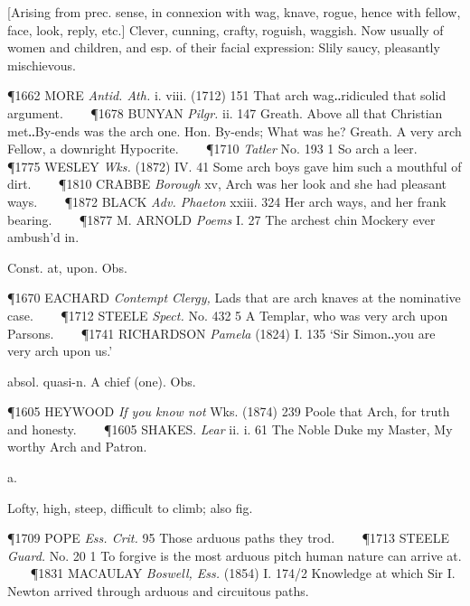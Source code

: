 \begin{description}[wide, labelwidth=!, labelindent=0pt]
\begin{myenumerate}
 [Arising from prec. sense, in connexion with wag, knave, rogue, hence with fellow, face, look, reply, etc.] Clever, cunning, crafty, roguish, waggish. Now usually of women and children, and esp. of their facial expression: Slily saucy, pleasantly mischievous.

\P 1662 MORE  \textit{Antid. Ath.} i. viii. (1712) 151 That arch wag‥ridiculed that solid argument.    
\P 1678 BUNYAN  \textit{Pilgr.} ii. 147 Greath. Above all that Christian met‥By-ends was the arch one. Hon. By-ends; What was he? Greath. A very arch Fellow, a downright Hypocrite.    
\P 1710 \textit{Tatler}  No. 193 1 So arch a leer.    
\P 1775 WESLEY  \textit{Wks.} (1872) IV. 41 Some arch boys gave him such a mouthful of dirt.    
\P 1810 CRABBE  \textit{Borough} xv, Arch was her look and she had pleasant ways.    
\P 1872 BLACK  \textit{Adv. Phaeton} xxiii. 324 Her arch ways, and her frank bearing.    
\P 1877 M. ARNOLD  \textit{Poems} I. 27 The archest chin Mockery ever ambush'd in.

 Const. at, upon. Obs.

\P 1670 EACHARD  \textit{Contempt Clergy,} Lads that are arch knaves at the nominative case.    
\P 1712 STEELE  \textit{Spect.} No. 432 5 A Templar, who was very arch upon Parsons.    
\P 1741 RICHARDSON  \textit{Pamela} (1824) I. 135 ‘Sir Simon‥you are very arch upon us.’

 absol. quasi-n. A chief (one). Obs.

\P 1605 HEYWOOD  \textit{If you know not} Wks. (1874) 239 Poole that Arch, for truth and honesty.    
\P 1605 SHAKES.  \textit{Lear} ii. i. 61 The Noble Duke my Master, My worthy Arch and Patron.
\end{myenumerate}


 a.

\noindent {}

\vspace{-0.3cm}

\begin{myenumerate}

 Lofty, high, steep, difficult to climb; also fig.

\P 1709 POPE  \textit{Ess. Crit.} 95 Those arduous paths they trod.    
\P 1713 STEELE  \textit{Guard.} No. 20 1 To forgive is the most arduous pitch human nature can arrive at.    
\P 1831 MACAULAY  \textit{Boswell, Ess.} (1854) I. 174/2 Knowledge at which Sir I. Newton arrived through arduous and circuitous paths.


\end{myenumerate}
\end{description}
